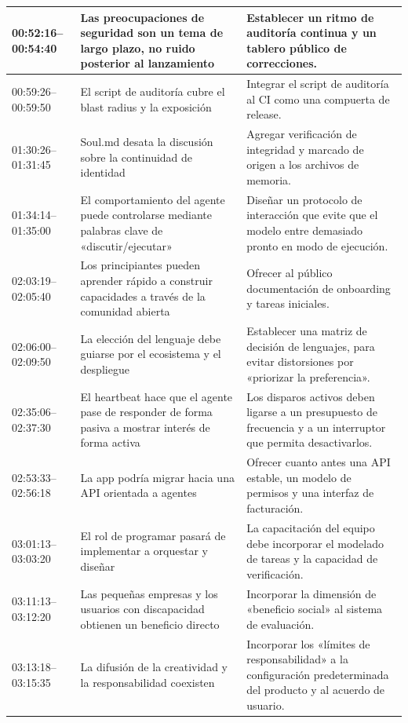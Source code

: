 \begin{longtable}{p{}p{}p{}}
\midrule
00:52:16--00:54:40 & Las preocupaciones de seguridad son un tema de largo plazo, no ruido posterior al lanzamiento & Establecer un ritmo de auditoría continua y un tablero público de correcciones. \\
\midrule
00:59:26--00:59:50 & El script de auditoría cubre el blast radius y la exposición & Integrar el script de auditoría al CI como una compuerta de release. \\
\midrule
01:30:26--01:31:45 & Soul.md desata la discusión sobre la continuidad de identidad & Agregar verificación de integridad y marcado de origen a los archivos de memoria. \\
\midrule
01:34:14--01:35:00 & El comportamiento del agente puede controlarse mediante palabras clave de «discutir/ejecutar» & Diseñar un protocolo de interacción que evite que el modelo entre demasiado pronto en modo de ejecución. \\
\midrule
02:03:19--02:05:40 & Los principiantes pueden aprender rápido a construir capacidades a través de la comunidad abierta & Ofrecer al público documentación de onboarding y tareas iniciales. \\
\midrule
02:06:00--02:09:50 & La elección del lenguaje debe guiarse por el ecosistema y el despliegue & Establecer una matriz de decisión de lenguajes, para evitar distorsiones por «priorizar la preferencia». \\
\midrule
02:35:06--02:37:30 & El heartbeat hace que el agente pase de responder de forma pasiva a mostrar interés de forma activa & Los disparos activos deben ligarse a un presupuesto de frecuencia y a un interruptor que permita desactivarlos. \\
\midrule
02:53:33--02:56:18 & La app podría migrar hacia una API orientada a agentes & Ofrecer cuanto antes una API estable, un modelo de permisos y una interfaz de facturación. \\
\midrule
03:01:13--03:03:20 & El rol de programar pasará de implementar a orquestar y diseñar & La capacitación del equipo debe incorporar el modelado de tareas y la capacidad de verificación. \\
\midrule
03:11:13--03:12:20 & Las pequeñas empresas y los usuarios con discapacidad obtienen un beneficio directo & Incorporar la dimensión de «beneficio social» al sistema de evaluación. \\
\midrule
03:13:18--03:15:35 & La difusión de la creatividad y la responsabilidad coexisten & Incorporar los «límites de responsabilidad» a la configuración predeterminada del producto y al acuerdo de usuario. \\
\bottomrule
\end{longtable}

